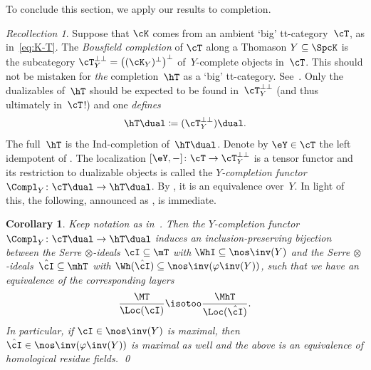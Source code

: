 \documentclass[11pt]{amsart}
\numberwithin{equation}{section} %
\theoremstyle{plain}
\newtheorem{cor}[equation]{Corollary}
\theoremstyle{definition}
\theoremstyle{remark}
\newtheorem{rec}[equation]{Recollection}
\begin{document}
To conclude this section, we apply our results to completion.
%
\begin{rec}
\label{rec:completion}%
Suppose that $\cK$ comes from an ambient `big' tt-category~$\cT$, as in~\eqref{eq:K-T}. The \emph{Bousfield completion} of $\cT$ along a Thomason $Y \subseteq \SpcK$ is the subcategory $\cT_Y^{\perp\perp}=\big((\cK_Y)^{\perp}\big)^{\perp}$ of~$Y$-complete objects in~$\cT$.
This should not be mistaken for \emph{the} completion~$\hT$ as a `big' tt-category. See~\cite[Example~2.13 and Remark~5.4]{BalmerSanders26}.
Only the dualizables of~$\hT$ should be expected to be found in~$\cT_Y^{\perp \perp}$ (and thus ultimately in~$\cT$!) and one \emph{defines}
%
\[
\hT\dual\coloneq(\cT_Y^{\perp \perp})\dual.
\]
%
The full~$\hT$ is the Ind-completion of~$\hT\dual$.
Denote by $\eY\in\cT$ the left idempotent of \cite{BalmerFavi11}.
The localization $[\eY, -] \colon \cT \to \cT_Y^{\perp \perp}$ is a tensor functor and its restriction to dualizable objects is called the \emph{$Y$-completion functor} $\Compl_Y\colon \cT\dual\to \hT\dual$.
By \cite[Theorem 4.6]{BalmerSanders25}, it is an equivalence over~$Y$. In light of this, the following, announced as , is immediate.
\end{rec}

\begin{cor}
\label{thm:residue-completion}
Keep notation as in~. Then the $Y$\!-completion functor $\Compl_Y\colon \cT\dual\to \hT\dual$ induces an inclusion-preserving bijection between the Serre $\otimes$-ideals $\cI\subseteq \mT$ with $\WhI \subseteq \nos\inv(Y)$ and the Serre $\otimes$-ideals~$\hat\cI\subseteq \mhT$ with $\Wh(\hat{\cI}) \subseteq \nos\inv(\varphi\inv(Y))$, such that we have an equivalence of the corresponding layers
    \begin{equation*}
    \frac{\MT}{\Loc(\cI)} \isotoo \frac{\MhT}{\Loc(\hat\cI)}.
    \end{equation*}
In particular, if $\cI\in \nos\inv(Y)$ is maximal, then $\hat\cI \in \nos\inv(\varphi\inv(Y))$ is maximal as well and the above is an equivalence of homological residue fields.
\qed\end{cor}

\end{document}
